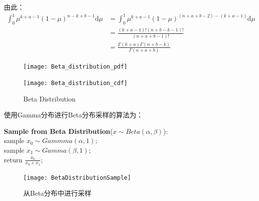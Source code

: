 由此：
\begin{displaymath}
\begin{split}
\int_0^1 \mu^{k+a-1} (1-\mu)^{n-k+b-1} \mathrm{d} \mu 
&= \int_0^1 \mu^{k+a-1} (1-\mu)^{(n+a+b-2)-(k+a-1)} \mathrm{d} \mu \\
&= \frac{(k+a-1)!(n+b-k-1)!}{(n+a+b-1)!}\\
&= \frac{\Gamma{(k+a)}\Gamma{(n+b-k)}}{\Gamma{(n+a+b)}}
\end{split}
\end{displaymath}

\begin{figure}[htbp]
\centering
\begin{subfloat}
\centering
\texttt{[image: Beta\_distribution\_pdf]}
\end{subfloat}
\begin{subfloat}
\centering
\texttt{[image: Beta\_distribution\_cdf]}
\end{subfloat}
\caption{Beta Distribution}
\end{figure}

使用Gamma分布进行Beta分布采样的算法为：

\begin{minipage}{0.8\textwidth}\centering
\begin{algorithm}[H]
\textbf{Sample from Beta Distribution}($x \sim Beta(\alpha, \beta)$):\\
sample $x_0 \sim Gammma(\alpha, 1)$;\\
sample $x_1 \sim Gamma(\beta, 1)$;\\
return $\frac{x_0}{x_0+x_1}$;\\
\end{algorithm}
\end{minipage}

\begin{figure}[htbp]
\centering
\texttt{[image: BetaDistributionSample]}
\caption{从Beta分布中进行采样}
\end{figure}


